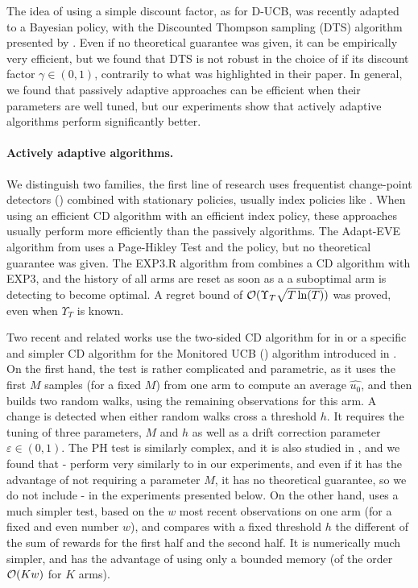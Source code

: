 The idea of using a simple discount factor, as for D-UCB, was recently adapted to a Bayesian policy, with the Discounted Thompson sampling (DTS) algorithm presented by \cite{RajKalyani17}.
Even if no theoretical guarantee was given, it can be empirically very efficient, but we found that DTS is not robust in the choice of if its discount factor $\gamma\in(0,1)$, contrarily to what was highlighted in their paper.
%
In general, we found that passively adaptive approaches can be efficient when their parameters are well tuned, but our experiments show that actively adaptive algorithms perform significantly better.


\paragraph{Actively adaptive algorithms.}
%
We distinguish two families,
the first line of research uses frequentist change-point detectors (\cite{Basseville93}) combined with stationary policies, usually index policies like \UCB.
When using an efficient CD algorithm with an efficient index policy, these approaches usually perform more efficiently than the passively algorithms.
%
The Adapt-EVE algorithm from \cite{Hartland06} uses a Page-Hikley Test and the \UCB{} policy, but no theoretical guarantee was given.
The EXP3.R algorithm from \cite{Allesiardo15,Allesiardo17} combines a CD algorithm with EXP3, and the history of all arms are reset as soon as a a suboptimal arm is detecting to become optimal.
A regret bound of $\mathcal{O}(\Upsilon_T \sqrt{T \ln(T)})$ was proved, even when $\Upsilon_T$ is known.

Two recent and related works use
the two-sided \CUSUM{} CD algorithm for \CUSUMUCB{} in \cite{LiuLeeShroff17}
or a specific and simpler CD algorithm for the Monitored UCB (\MUCB) algorithm introduced in \cite{CaoZhenKvetonXie18}.
%
On the first hand,
the \CUSUM{} test is rather complicated and parametric, as it uses the first $M$ samples (for a fixed $M$) from one arm to compute an average $\hat{u_0}$, and then builds two random walks, using the remaining observations for this arm. A change is detected when either random walks cross a threshold $h$.
It requires the tuning of three parameters, $M$ and $h$ as well as a drift correction parameter $\varepsilon\in(0,1)$.
The PH test is similarly complex, and it is also studied in \cite{LiuLeeShroff17},
and we found that \PHT-\UCB{} perform very similarly to \CUSUMUCB{} in our experiments,
and even if it has the advantage of not requiring a parameter $M$,
it has no theoretical guarantee, so we do not include \PHT-\UCB{} in the experiments presented below.
%
On the other hand, \MUCB{} uses a much simpler test, based on the $w$ most recent observations on one arm (for a fixed and even number $w$), and compares with a fixed threshold $h$ the different of the sum of rewards for the first half and the second half. It is numerically much simpler, and has the advantage of using only a bounded memory (of the order $\mathop{}\mathopen{}\mathcal{O}\mathopen{}\left(K w\right)$ for $K$ arms).

